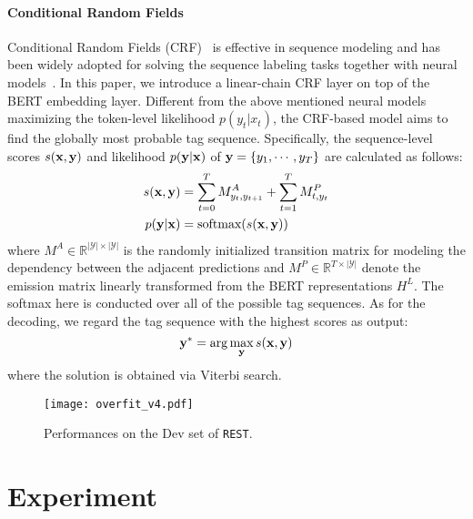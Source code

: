 \documentclass[11pt,a4paper]{article}
\begin{document}
\paragraph{Conditional Random Fields} Conditional Random Fields (CRF)~\cite{lafferty2001conditional} is effective in sequence modeling and has been widely adopted for solving the sequence labeling tasks together with neural models~\cite{huang2015bidirectional,lample-etal-2016-neural,ma-hovy-2016-end}. In this paper, we introduce a linear-chain CRF layer on top of the BERT embedding layer. Different from the above mentioned neural models maximizing the token-level likelihood $p(y_t|x_t)$, the CRF-based model aims to find the globally most probable tag sequence. Specifically, the sequence-level scores $s(\mathrm{\bf x},\mathrm{\bf y})$ and likelihood $p(\mathrm{\bf y}|\mathrm{\bf x})$ of $\mathrm{\bf y} = \{y_1,\cdots,y_T\}$ are calculated as follows:
\begin{equation}
\begin{split}
        s(\mathrm{\bf x},\mathrm{\bf y}) &= \sum^T_{t=0} M^A_{y_t,y_{t+1}} + \sum^T_{t=1} M^P_{t, y_t} \\
        p(\mathrm{\bf y}|\mathrm{\bf x}) &= \text{softmax}(s(\mathrm{\bf x},\mathrm{\bf y}))
    \end{split}
\end{equation}
where $M^A \in \mathbb{R}^{|\mathcal{Y}| \times |\mathcal{Y}|}$ is the randomly initialized transition matrix for modeling the dependency between the adjacent predictions and $M^P \in \mathbb{R}^{T \times |\mathcal{Y}|}$ denote the emission matrix linearly transformed from the BERT representations $H^L$. The softmax here is conducted over all of the possible tag sequences. As for the decoding, we regard the tag sequence with the highest scores as output:
\begin{equation}
    \mathrm{\bf y}^* = \arg\max_{\mathrm{\bf y}} s(\mathrm{\bf x},\mathrm{\bf y})
\end{equation}
where the solution is obtained via Viterbi search.

\begin{figure}
\centering
    \texttt{[image: overfit\_v4.pdf]}
    \caption{Performances on the Dev set of \texttt{REST}.}
    \label{fig:overfit}
\end{figure}

\section{Experiment}
\end{document}
